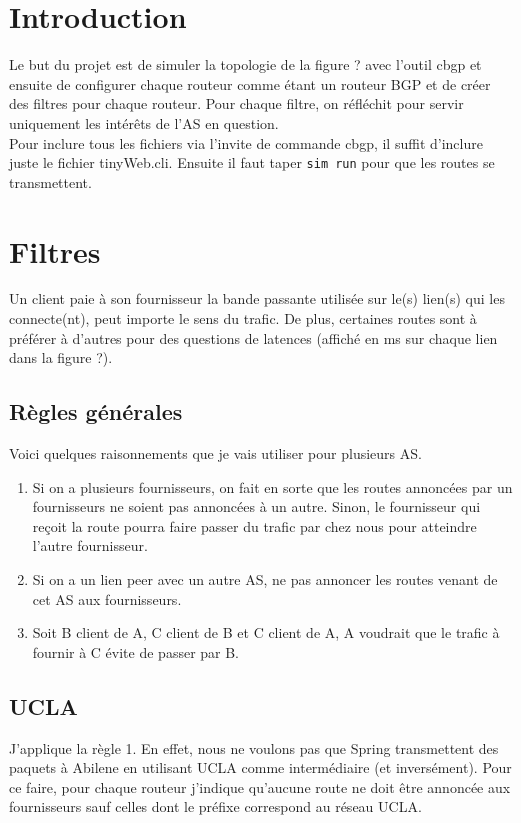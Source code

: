 \documentclass[a4paper, 12pt]{article}
\begin{document}


\section{Introduction}
Le but du projet est de simuler la topologie de la figure ? avec l'outil cbgp et ensuite de configurer chaque routeur comme étant un routeur BGP et de créer des filtres pour chaque routeur.
Pour chaque filtre, on réfléchit pour servir uniquement les intérêts de l'AS en question.
\\

Pour inclure tous les fichiers via l'invite de commande cbgp, il suffit d'inclure juste le fichier tinyWeb.cli.
Ensuite il faut taper \texttt{sim run} pour que les routes se transmettent.
\section{Filtres}
Un client paie à son fournisseur la bande passante utilisée sur le(s) lien(s) qui les connecte(nt), peut importe le sens du trafic.
De plus, certaines routes sont à préférer à d'autres pour des questions de latences (affiché en ms sur chaque lien dans la figure ?).
\subsection{Règles générales}
Voici quelques raisonnements que je vais utiliser pour plusieurs AS.
\begin{enumerate}
 \item Si on a plusieurs fournisseurs, on fait en sorte que les routes annoncées par un fournisseurs ne soient pas annoncées à un autre.
 Sinon, le fournisseur qui reçoit la route pourra faire passer du trafic par chez nous pour atteindre l'autre fournisseur.
 \item Si on a un lien peer avec un autre AS, ne pas annoncer les routes venant de cet AS aux fournisseurs.
 \item Soit B client de A, C client de B et C client de A, A voudrait que le trafic à fournir à C évite de passer par B. %
\end{enumerate}

\subsection{UCLA}
J'applique la règle 1.
En effet, nous ne voulons pas que Spring transmettent des paquets à Abilene en utilisant UCLA comme intermédiaire (et inversément).
Pour ce faire, pour chaque routeur j'indique qu'aucune route ne doit être annoncée aux fournisseurs sauf celles dont le préfixe correspond au réseau UCLA.
\end{document}
